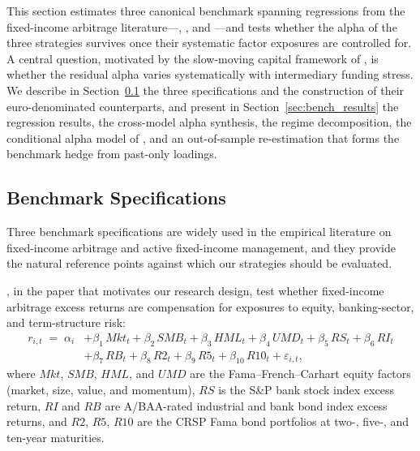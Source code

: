 


This section estimates three canonical benchmark spanning
regressions from the fixed-income arbitrage
literature---\citet{duarte2007risk}, \citet{fung2004hedge}, and
\citet{brooks2020active}---and tests whether the alpha of the three
strategies survives once their systematic factor exposures are
controlled for. A central question, motivated by the slow-moving
capital framework of \citet{duffie2010presidential}, is whether the
residual alpha varies systematically with intermediary funding
stress. We describe in Section~\ref{sec:bench_specs} the three
specifications and the construction of their euro-denominated
counterparts, and present in Section~\ref{sec:bench_results} the
regression results, the cross-model alpha synthesis, the regime
decomposition, the conditional alpha model of
\citet{christopherson1998conditioning}, and an out-of-sample
re-estimation that forms the benchmark hedge from past-only loadings.



\subsection{Benchmark Specifications}
\label{sec:bench_specs}

Three benchmark specifications are widely used in the empirical
literature on fixed-income arbitrage and active fixed-income management,
and they provide the natural reference points against which our
strategies should be evaluated.

\citet{duarte2007risk}, in the paper that motivates our research
design, test whether fixed-income arbitrage excess returns are
compensation for exposures to equity, banking-sector, and
term-structure risk:
\begin{equation}\label{eq:duarte}
\begin{split}
  r_{i,t} \;=\; \alpha_i
  &+ \beta_1\,\textit{Mkt}_t + \beta_2\,\textit{SMB}_t
   + \beta_3\,\textit{HML}_t + \beta_4\,\textit{UMD}_t + \beta_5\,\textit{RS}_t + \beta_6\,\textit{RI}_t\\
  &+ \beta_7\,\textit{RB}_t + \beta_8\,\textit{R2}_t + \beta_9\,\textit{R5}_t
   + \beta_{10}\,\textit{R10}_t + \varepsilon_{i,t},
\end{split}
\end{equation}
where $\textit{Mkt}$, $\textit{SMB}$, $\textit{HML}$, and
$\textit{UMD}$ are the Fama--French--Carhart equity factors (market, size, value, and momentum),
$\textit{RS}$ is the S\&P bank stock index excess return,
$\textit{RI}$ and $\textit{RB}$ are A/BAA-rated industrial and bank
bond index excess returns, and $\textit{R2}$, $\textit{R5}$,
$\textit{R10}$ are the CRSP Fama bond portfolios at two-, five-, and
ten-year maturities.

